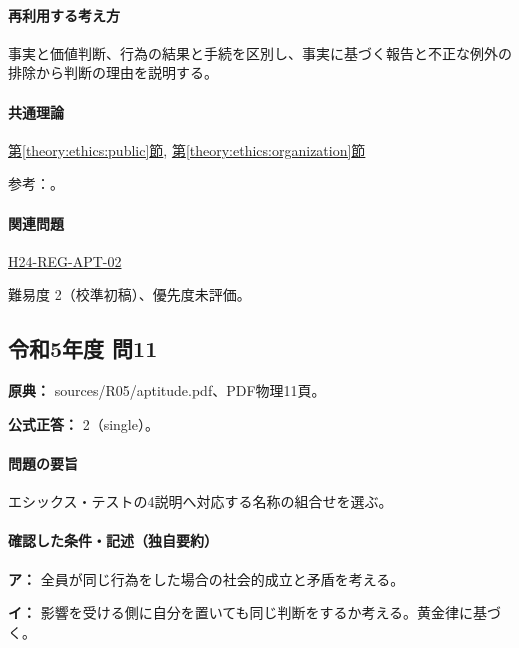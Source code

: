 \paragraph{再利用する考え方} 事実と価値判断、行為の結果と手続を区別し、事実に基づく報告と不正な例外の排除から判断の理由を説明する。

\paragraph{共通理論} \hyperref[theory:ethics:public]{第\ref*{theory:ethics:public}節}, \hyperref[theory:ethics:organization]{第\ref*{theory:ethics:organization}節}

\par 参考：\cite{ipej_ethics2011,mext_misconduct2014}。

\paragraph{関連問題} \hyperref[q:h24-reg-apt-02]{H24-REG-APT-02}

\par 難易度 2（校準初稿）、優先度未評価。

\subsection{令和5年度 問11}
\label{q:r05-reg-apt-11}

\noindent\textbf{原典：} sources/R05/aptitude.pdf、PDF物理11頁。

\textbf{公式正答：} 2（single）。

\paragraph{問題の要旨} エシックス・テストの4説明へ対応する名称の組合せを選ぶ。

\paragraph{確認した条件・記述（独自要約）}\mbox{}\par

\noindent\textbf{ア：} 全員が同じ行為をした場合の社会的成立と矛盾を考える。\par

\noindent\textbf{イ：} 影響を受ける側に自分を置いても同じ判断をするか考える。黄金律に基づく。\par

